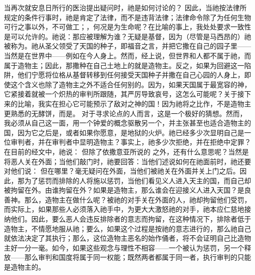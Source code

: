 当再次就安息日所行的医治提出疑问时，祂是如何讨论的？ 因此，当祂按法律所规定的条件行事时，祂是肯定了法律，而不是违背法律；法律命令除了为任何生物可行之事以外，不可做工；，何况是为生命呢？在比喻的事上，我处处要求一致性是可以允许的。祂说：那应被理解为谁？无疑是基督，因为（尽管是马西昂的）祂被称为。祂从圣父领受了天国的种子，即福音之言，并把它撒在自己的园子里——当然是在世界中——例如在今人身上。然而，经上说，但世界和人都不属于祂，而属于造物主；因此，那撒种在自己土地上的就是造物主。反之，如果为回避这一陷阱，他们宁愿将位格从基督转移到任何接受天国种子并撒在自己心园的人身上，即使这个含义也除了造物主之外不适合任何别的。因为，如果天国属于最宽容的神，它紧接着就被一个炽热的审判所跟随，其严厉导致哀号，这怎么可能呢？关于接下来的比喻，我实在担心它可能预示了敌对之神的国！因为祂将之比作，不是造物主更熟悉的无酵饼，而是。 对于寻求论点的人而言，这是一个极好的猜想。然而，我必须从自己这一面，用一个钟爱的概念驱散另一个，并主张甚至也适合造物主的国，因为它之后是，或者如果你愿意，是地狱的火炉。祂已经多少次显明自己是一位审判者，并在审判者中显明造物主？事实上，祂多少次拒绝，并在拒绝中定罪？在目前的经文中，祂说： 但除了依撒意亚所说的 之外，还有什么意思呢？当然是将恶人关在外面；当他们敲门时，祂要回答：当他们述说如何在祂面前时，祂还要对他们说： 但在哪里？毫无疑问在外面，当他们被祂关在外面并关上门之后。因此，那为了惩罚而排除的人将施以惩罚，当他们看见义人进入天主的国，而自己却被拘留在外。由谁拘留在外？如果是造物主，那么谁会在迎接义人进入天国？是良善神。那么，造物主在做什么呢？被祂的对手关在外面的人，祂却拘留他们受罚，而实际上，如果那些人必须落入祂手中，为更大大激怒祂的对手，祂本应仁慈地接纳他们。因此，要么恶人会违反排除者的意志而拘留，在这种情况下，排除者低于造物主，不情愿地服从祂；要么，如果这个过程是按祂的意志进行的，那么祂自己就依法决定了其执行；那么，这位造物主恶名的始作俑者，将不会证明自己比造物主好一分一毫。如今，如果这些观念与理性不相容——一个被认为惩罚，另一个释放——那么审判和国度将属于同一权能；既然两者都属于同一者，执行审判的只能是造物主的。\par

